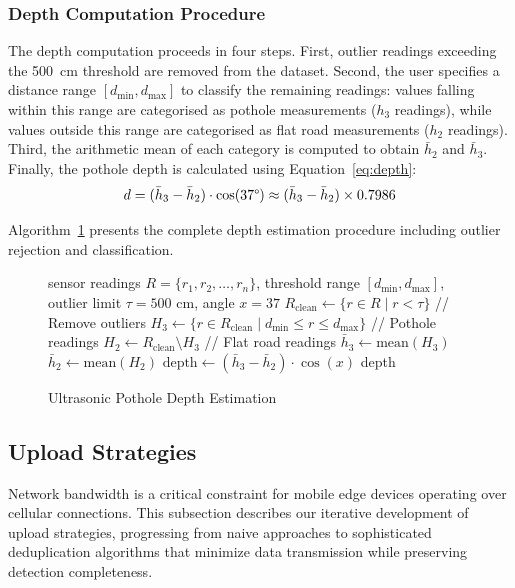 \documentclass{ieeeaccess}
\begin{document}
\subsubsection{Depth Computation Procedure}

The depth computation proceeds in four steps. First, outlier readings exceeding the 500~cm threshold are removed from the dataset. Second, the user specifies a distance range $[d_{\min}, d_{\max}]$ to classify the remaining readings: values falling within this range are categorised as pothole measurements ($h_3$ readings), while values outside this range are categorised as flat road measurements ($h_2$ readings). Third, the arithmetic mean of each category is computed to obtain $\bar{h}_2$ and $\bar{h}_3$. Finally, the pothole depth is calculated using Equation~\ref{eq:depth}:
\begin{equation}
d = (\bar{h}_3 - \bar{h}_2) \cdot \cos(37\text{\textdegree{}}) \approx (\bar{h}_3 - \bar{h}_2) \times 0.7986
\end{equation}

Algorithm~\ref{alg:depth_estimation} presents the complete depth estimation procedure including outlier rejection and classification.

\begin{figure}[t]
\centering
\begin{algorithm}[H]
\caption{Ultrasonic Pothole Depth Estimation}
\label{alg:depth_estimation}
\begin{algorithmic}[1]
\Require sensor readings $R = \{r_1, r_2, \ldots, r_n\}$, threshold range $[d_{\min}, d_{\max}]$, outlier limit $\tau = 500$ cm, angle $x = 37$\textdegree{}
\State $R_{\text{clean}} \gets \{r \in R \mid r < \tau\}$ \hfill // Remove outliers
\State $H_3 \gets \{r \in R_{\text{clean}} \mid d_{\min} \leq r \leq d_{\max}\}$ \hfill // Pothole readings
\State $H_2 \gets R_{\text{clean}} \setminus H_3$ \hfill // Flat road readings
\State $\bar{h}_3 \gets \text{mean}(H_3)$
\State $\bar{h}_2 \gets \text{mean}(H_2)$
\State $\text{depth} \gets (\bar{h}_3 - \bar{h}_2) \cdot \cos(x)$
\State \Return depth
\end{algorithmic}
\end{algorithm}
\end{figure}

\subsection{Upload Strategies}

Network bandwidth is a critical constraint for mobile edge devices operating over cellular connections. This subsection describes our iterative development of upload strategies, progressing from naive approaches to sophisticated deduplication algorithms that minimize data transmission while preserving detection completeness.
\end{document}
